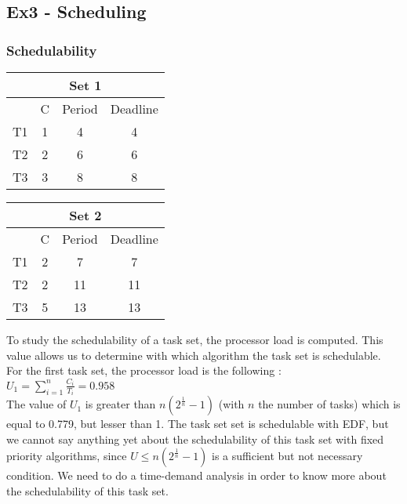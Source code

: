 \subsection{Ex3 - Scheduling}

\subsubsection{Schedulability}

\begin{center}
	\begin{tabular}{|c|c|c|c|}
		\hline
		\multicolumn{4}{|c|}{\textbf{Set 1}} \\
		\hline
		\, & C & Period & Deadline \\
		\hline
		T1 & 1 & 4 & 4 \\
		\hline
		T2 & 2 & 6 & 6 \\
		\hline
		T3 & 3 & 8 & 8 \\
		\hline
	\end{tabular}
	\quad
	\begin{tabular}{|c|c|c|c|}
		\hline
		\multicolumn{4}{|c|}{\textbf{Set 2}} \\
		\hline
		\, & C & Period & Deadline \\
		\hline
		T1 & 2 & 7 & 7 \\
		\hline
		T2 & 2 & 11 & 11 \\
		\hline
		T3 & 5 & 13 & 13 \\
		\hline
	\end{tabular}
\end{center}

To study the schedulability of a task set, the processor load is computed. This value allows us to determine with which algorithm the task set is schedulable. \\

\noindent For the first task set, the processor load is the following : \\

$U_1 = \sum_{i=1}^{n} \frac{C_i}{T_i} = 0.958$ \\

The value of $U_1$ is greater than $n(2^{\frac{1}{n}}-1)$ (with $n$ the number of tasks) which is equal to 0.779, but lesser than 1. The task set set is schedulable with EDF, but we cannot say anything yet about the schedulability of this task set with fixed priority algorithms, since $U \leq n(2^{\frac{1}{n}}-1)$ is a sufficient but not necessary condition. We need to do a time-demand analysis in order to know more about the schedulability of this task set.\\

